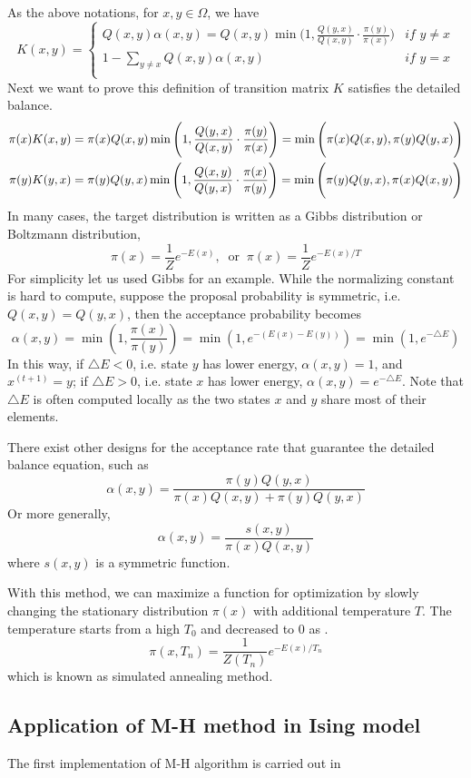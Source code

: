 \documentclass{article}
\begin{document}
As the above notations, for $x,y \in \Omega$, we have
\[ K(x,y) = \begin{cases} 
      Q(x,y)\alpha(x,y)=Q(x,y)\min\Bigg(1,\frac{Q(y,x)}{Q(x,y)}\cdot\frac{\pi(y)}{\pi(x)}\Bigg) & \textit{if } y\neq x\\
      1-\sum_{y\neq x}Q(x,y)\alpha(x,y) &\textit{if } y=x \\
   \end{cases}
\]
Next we want to prove this definition of transition matrix $K$ satisfies the detailed balance.
\begin{align*}
\pi(x)K(x,y)&= \pi(x)Q(x,y)\min\Bigg(1,\frac{Q(y,x)}{Q(x,y)}\cdot\frac{\pi(y)}{\pi(x)}\Bigg)=\min\Bigg(\pi(x)Q(x,y),\pi(y)Q(y,x)\Bigg)\\
\pi(y)K(y,x)&= \pi(y)Q(y,x)\min\Bigg(1,\frac{Q(x,y)}{Q(y,x)}\cdot\frac{\pi(x)}{\pi(y)}\Bigg)=\min\Bigg(\pi(y)Q(y,x),\pi(x)Q(x,y)\Bigg)
\end{align*}
In many cases, the target distribution is written as a Gibbs distribution or Boltzmann distribution,
\[\pi(x)=\frac{1}{Z}e^{-E(x)},\;\;\text{or}\;\;\pi(x)=\frac{1}{Z}e^{-E(x)/T}\]
For simplicity let us used Gibbs for an example. While the normalizing constant is hard to compute, suppose the proposal probability is symmetric, i.e. $Q(x,y)=Q(y,x)$, then the acceptance probability becomes
\[\alpha(x,y)=\min(1,\frac{\pi(x)}{\pi(y)})=\min(1,e^{-(E(x)-E(y))})=\min(1,e^{-\triangle E})\]
In this way, if $\triangle E<0$, i.e. state $y$ has lower energy, $\alpha(x,y)=1$, and $x^{(t+1)}=y$; if $\triangle E>0$, i.e. state $x$ has lower energy, $\alpha(x,y)=e^{-\triangle E}$. Note that $\triangle E$ is often computed locally as the two states $x$ and $y$ share most of their elements.

There exist other designs for the acceptance rate that guarantee the detailed balance equation, such as
\[\alpha(x,y)=\frac{\pi(y)Q(y,x)}{\pi(x)Q(x,y)+\pi(y)Q(y,x)}\]
Or more generally,
\[\alpha(x,y)=\frac{s(x,y)}{\pi(x)Q(x,y)}\]
where $s(x,y)$ is a symmetric function.

With this method, we can maximize a function for optimization by slowly changing the stationary distribution $\pi(x)$ with additional temperature $T$. The temperature starts from a high $T_0$ and decreased to 0 as \asngotoinfty.
\[\pi(x, T_n)=\frac{1}{Z(T_n)}e^{-E(x)/T_n}\]
which is known as simulated annealing method.


\subsection{Application of M-H method in Ising model}
The first implementation of M-H algorithm is carried out in 
\end{document}
